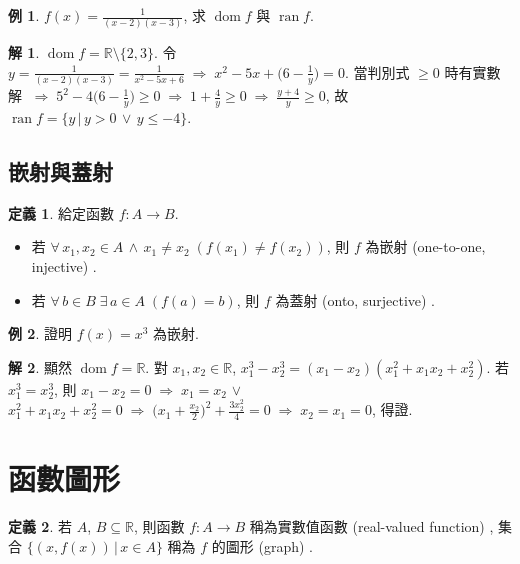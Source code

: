 \documentclass[12pt]{extarticle}
\newcommand{\ds}{\displaystyle}
\newcommand{\ie}{\;\Longrightarrow\;}
\DeclareMathOperator*{\dom}{dom}
\DeclareMathOperator*{\ran}{ran}
\theoremstyle{definition}
\newtheorem*{dfn}{定義}
\newtheorem*{ex}{例}
\newtheorem*{sol}{解}
\begin{document}
\begin{ex}
  $\ds f(x) = \frac{1}{(x-2)(x-3)}$, 求 $\dom f$ 與 $\ran f$. 
\end{ex}

\begin{sol}
  $\dom f = \mathbb{R}\setminus\{2, 3\}$. 令 $\ds y = \frac{1}{(x - 2)(x - 3)} = \frac{1}{x^2 - 5x + 6}\ie x^2 - 5 x + \big(6 - \frac{1}{y}\big) = 0$. 當判別式 $\geqslant 0$ 時有實數解 $\ds\ie 5^2 - 4\big(6 - \frac{1}{y}\big)\geqslant 0 \ie 1 + \frac{4}{y}\geqslant 0 \ie \frac{y + 4}{y}\geqslant 0$, 故 $\ds\ran f = \{y\,|\,y > 0\,\vee\,y\leqslant -4\}$. 
\end{sol}

\subsection*{嵌射與蓋射}
\begin{dfn} 給定函數 $f: A\to B$. 
  \begin{itemize}\setlength\itemsep{0em}
    \item 若 $\forall\,x_1, x_2\in A\,\wedge\,x_1\not=x_2\; (f(x_1)\not=f(x_2))$, 則 $f$ 為嵌射 (one-to-one, injective) . 
    \item 若 $\forall\,b\in B\;\exists\,a\in A\;(f(a) = b)$, 則 $f$ 為蓋射 (onto, surjective) . 
  \end{itemize}
\end{dfn}

\begin{ex}
  證明 $f(x) = x^3$ 為嵌射. 
\end{ex}

\begin{sol}
  顯然 $\dom f = \mathbb{R}$. 對 $x_1, x_2\in\mathbb{R}$, $x_1^3 - x_2^3 = (x_1 - x_2)(x_1^2 + x_1 x_2 + x_2^2)$. 若 $x_1^3 = x_2^3$, 則 $\ds x_1 - x_2 = 0\ie x_1 = x_2$ $\vee$ $\ds x_1^2 + x_1 x_2 + x_2^2 = 0 \ie \Big(x_1 + \frac{x_2}{2}\Big)^2 + \frac{3x_2^2}{4} = 0 \ie x_2 = x_1 = 0$, 得證.  
\end{sol}

\section*{函數圖形}

\begin{dfn}
  若 $A$, $B\subseteq\mathbb{R}$, 則函數 $f: A\to B$ 稱為實數值函數 (real-valued function) , 集合 $\{(x, f(x))\,|\,x\in A\}$ 稱為 $f$ 的圖形 (graph) . 
\end{dfn}
\end{document}
